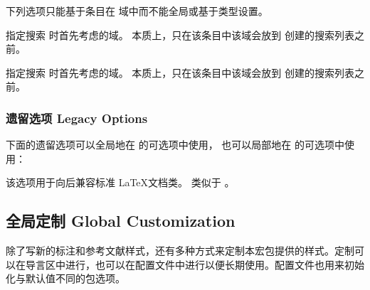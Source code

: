 下列选项只能基于条目在  域中而不能全局或基于类型设置。

\begin{optionlist}


指定搜索  时首先考虑的域。
本质上，只在该条目中该域会放到  创建的搜索列表之前。


指定搜索  时首先考虑的域。
本质上，只在该条目中该域会放到  创建的搜索列表之前。

\end{optionlist}

\subsubsection{遗留选项 Legacy Options}

下面的遗留选项可以全局地在  的可选项中使用，
也可以局部地在  的可选项中使用：

\begin{optionlist}
	
\DeprecatedMark  %
该选项用于向后兼容标准 \LaTeX 文档类。
 类似于 。

\end{optionlist}


\subsection{全局定制 Global Customization}
\label{use:cfg}
除了写新的标注和参考文献样式，还有多种方式来定制本宏包提供的样式。定制可以在导言区中进行，也可以在配置文件中进行以便长期使用。配置文件也用来初始化与默认值不同的包选项。

